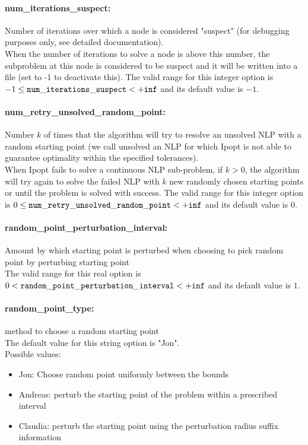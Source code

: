\paragraph{num\_iterations\_suspect:}\label{opt:num_iterations_suspect} Number of iterations over which a node is considered "suspect" (for debugging purposes only, see detailed documentation). \\
 When the number of iterations to solve a node is above this number, the subproblem at this node is considered to be suspect and it will be written into a file (set to -1 to deactivate this). The valid range for this integer option is
$-1 \le {\tt num\_iterations\_suspect } <  {\tt +inf}$
and its default value is $-1$.


\paragraph{num\_retry\_unsolved\_random\_point:}\label{opt:num_retry_unsolved_random_point} Number $k$ of times that the algorithm will try to resolve an unsolved NLP with a random starting point (we call unsolved an NLP for which Ipopt is not able to guarantee optimality within the specified tolerances). \\
 When Ipopt fails to solve a continuous NLP sub-problem, if $k > 0$, the algorithm will try again to solve the failed NLP with $k$ new randomly chosen starting points  or until the problem is solved with success. The valid range for this integer option is
$0 \le {\tt num\_retry\_unsolved\_random\_point } <  {\tt +inf}$
and its default value is $0$.


\paragraph{random\_point\_perturbation\_interval:}\label{opt:random_point_perturbation_interval} Amount by which starting point is perturbed when choosing to pick random point by perturbing starting point \\
 The valid range for this real option is 
$0 <  {\tt random\_point\_perturbation\_interval } <  {\tt +inf}$
and its default value is $1$.


\paragraph{random\_point\_type:}\label{opt:random_point_type} method to choose a random starting point \\
 The default value for this string option is "Jon".
\\ 
Possible values:
\begin{itemize}
   \item Jon: Choose random point uniformly between the bounds
   \item Andreas: perturb the starting point of the problem within a prescribed interval
   \item Claudia: perturb the starting point using the perturbation radius suffix information
\end{itemize}

